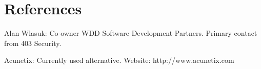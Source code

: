 \section{References}
\begin{description}
\item{Alan Wlasuk:}  Co-owner WDD Software Development Partners. Primary contact from 403 Security.
\item{Acunetix: } Currently used alternative. Website: http://www.acunetix.com
\end{description}
